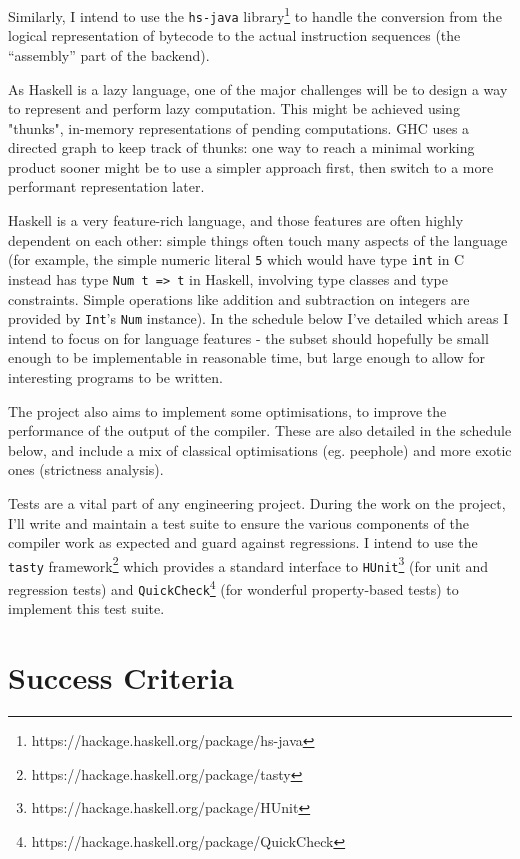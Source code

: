 \documentclass[12pt]{article}
\newcommand\haskell[1]{\texttt{#1}}
\newcommand\monospace[1]{\texttt{#1}}
\begin{document}
Similarly, I intend to use the \monospace{hs-java} library\footnote{https://hackage.haskell.org/package/hs-java} to
handle the conversion from the logical representation of bytecode to the actual instruction sequences (the ``assembly''
part of the backend).

As Haskell is a lazy language, one of the major challenges will be to design a way to represent and perform lazy
computation. This might be achieved using "thunks", in-memory representations of pending computations. GHC uses a
directed graph to keep track of thunks: one way to reach a minimal working product sooner might be to use a simpler
approach first, then switch to a more performant representation later.

Haskell is a very feature-rich language, and those features are often highly dependent on each other: simple things
often touch many aspects of the language (for example, the simple numeric literal \haskell{5} which would have type
\texttt{int} in C instead has type \haskell{Num t => t} in Haskell, involving type classes and type constraints.
Simple operations like addition and subtraction on integers are provided by \haskell{Int}'s \haskell{Num} instance). In
the schedule below I've detailed which areas I intend to focus on for language features - the subset should hopefully be
small enough to be implementable in reasonable time, but large enough to allow for interesting programs to be written.

The project also aims to implement some optimisations, to improve the performance of the output of the compiler. These
are also detailed in the schedule below, and include a mix of classical optimisations (eg. peephole) and more exotic
ones (strictness analysis).

Tests are a vital part of any engineering project. During the work on the project, I'll write and maintain a test suite
to ensure the various components of the compiler work as expected and guard against regressions. I intend to use the
\monospace{tasty} framework\footnote{https://hackage.haskell.org/package/tasty} which provides a standard interface to
\monospace{HUnit}\footnote{https://hackage.haskell.org/package/HUnit} (for unit and regression tests) and
\monospace{QuickCheck}\footnote{https://hackage.haskell.org/package/QuickCheck} (for wonderful property-based tests) to
implement this test suite.


\section*{Success Criteria}
\end{document}

